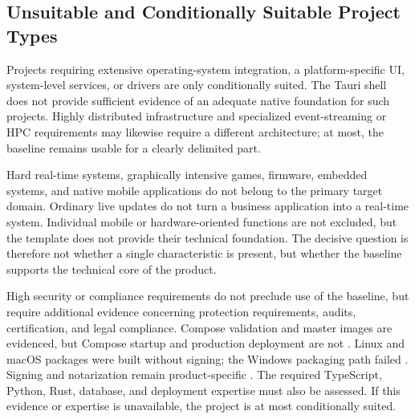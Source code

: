 \subsection{Unsuitable and Conditionally Suitable Project Types}
\label{subsec:ungeeignete-projekttypen}

Projects requiring extensive operating-system integration, a
platform-specific UI, system-level services, or drivers are only conditionally
suited. The Tauri shell does not provide sufficient evidence of an
adequate native foundation for such projects. Highly distributed
infrastructure and specialized event-streaming or HPC requirements may
likewise require a different architecture; at most, the baseline remains
usable for a clearly delimited part.

Hard real-time systems, graphically intensive games, firmware, embedded
systems, and native mobile applications do not belong to the primary target
domain. Ordinary live updates do not turn a business application into a
real-time system. Individual mobile or hardware-oriented functions are not
excluded, but the template does not provide their technical foundation.
The decisive question is therefore not whether a single characteristic is
present, but whether the baseline supports the technical core of the product.

High security or compliance requirements do not preclude use of the baseline,
but require additional evidence concerning protection requirements, audits,
certification, and legal compliance. Compose validation and master images are
evidenced, but Compose startup and production deployment are not
\parencite{kleiveist2026ci-core-run}. Linux and macOS packages were built
without signing; the Windows packaging path failed
\parencite{kleiveist2026ci-desktop-run}. Signing and notarization remain
product-specific \parencite{kleiveist2026release}. The required TypeScript,
Python, Rust, database, and deployment expertise must also be assessed.
If this evidence or expertise is unavailable, the project is at most
conditionally suited.
